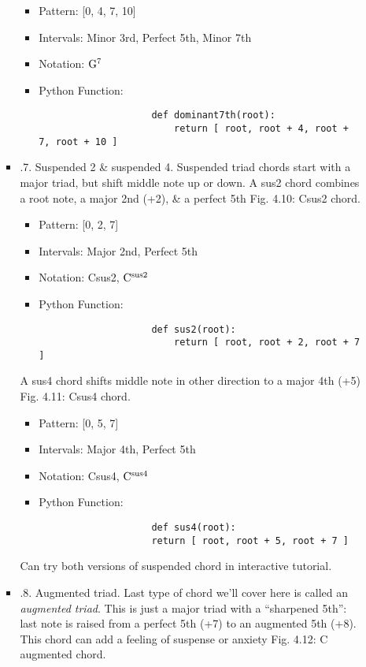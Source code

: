 \documentclass{article}
\begin{document}
\begin{itemize}
\begin{itemize}
\begin{itemize}
			\begin{itemize}
				\item Pattern: [0, 4, 7, 10]
				\item Intervals: Minor 3rd, Perfect 5th, Minor 7th
				\item Notation: $\rm G^7$
				\item Python Function:
				\begin{verbatim}
					def dominant7th(root):
					    return [ root, root + 4, root + 7, root + 10 ]
				\end{verbatim}
			\end{itemize}
			\item {.7. Suspended 2 \& suspended 4.} Suspended triad chords start with a major triad, but shift middle note up or down. A sus2 chord combines a root note, a major 2nd (+2), \& a perfect 5th {\sf Fig. 4.10: Csus2 chord.}
			\begin{itemize}
				\item Pattern: [0, 2, 7]
				\item Intervals: Major 2nd, Perfect 5th
				\item Notation: Csus2, $\rm C^{sus2}$
				\item Python Function:
				\begin{verbatim}
					def sus2(root):
					    return [ root, root + 2, root + 7 ]
				\end{verbatim}
			\end{itemize}
			A sus4 chord shifts middle note in other direction to a major 4th (+5) {\sf Fig. 4.11: Csus4 chord.}
			\begin{itemize}
				\item Pattern: [0, 5, 7]
				\item Intervals: Major 4th, Perfect 5th
				\item Notation: Csus4, $\rm C^{sus4}$
				\item Python Function:
				\begin{verbatim}
					def sus4(root):
					return [ root, root + 5, root + 7 ]
				\end{verbatim}
			\end{itemize}
			Can try both versions of suspended chord in interactive tutorial.
			\item {.8. Augmented triad.} Last type of chord we'll cover here is called an {\it augmented triad}. This is just a major triad with a ``sharpened 5th'': last note is raised from a perfect 5th (+7) to an augmented 5th (+8). This chord can add a feeling of suspense or anxiety {\sf Fig. 4.12: C augmented chord.}

\end{itemize}
\end{itemize}
\end{itemize}
\end{document}
